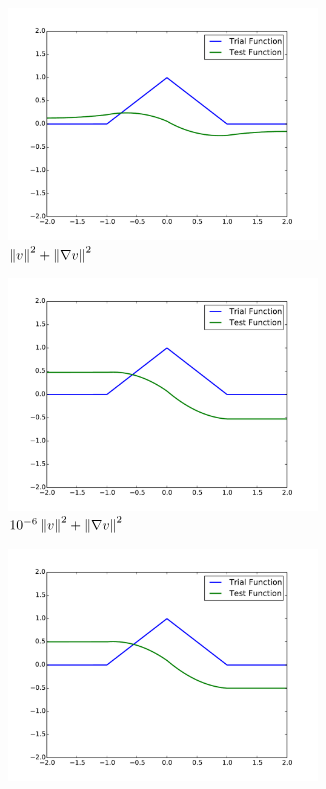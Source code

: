 \documentclass{article}
\begin{document}
\begin{figure}[ht]
\centering
\begin{subfigure}[t]{0.45\textwidth}
\centering
\includegraphics[width=0.9\textwidth]{OptimalTestFunctions/SpecialCases/Confusion1e-1_H1NoBC.pdf}
\caption{$\left\| v \right\|^2+\left\| \nabla v \right\|^2$}
\end{subfigure}
\begin{subfigure}[t]{0.45\textwidth}
\centering
\includegraphics[width=0.9\textwidth]{OptimalTestFunctions/SpecialCases/Confusion1e-1_1e-6NoBC.pdf}
\caption{$10^{-6}\left\| v \right\|^2+\left\| \nabla v \right\|^2$}
\end{subfigure}
\begin{subfigure}[t]{0.45\textwidth}
\centering
\includegraphics[width=0.9\textwidth]{OptimalTestFunctions/SpecialCases/Confusion1e-1_GradBC.pdf}

\end{subfigure}
\end{figure}
\end{document}
